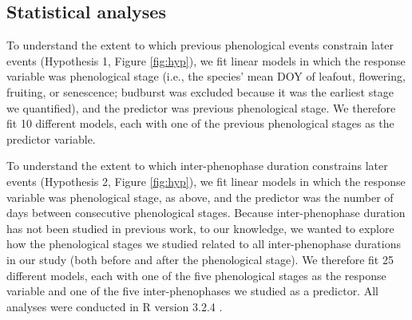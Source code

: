 \documentclass{article}
\begin{document}
\subsection*{Statistical analyses}
To understand the extent to which previous phenological events constrain later events (Hypothesis 1, Figure \ref{fig:hyp}), we fit linear models in which the response variable was phenological stage (i.e., the species' mean DOY of leafout, flowering, fruiting, or senescence; budburst was excluded because it was the earliest stage we quantified), and the predictor was previous phenological stage.  We therefore fit 10 different models, each with one of the previous phenological stages as the predictor variable. 
\par To understand the extent to which inter-phenophase duration constrains later events (Hypothesis 2, Figure \ref{fig:hyp}), we fit linear models in which the response variable was phenological stage, as above, and the predictor was the number of days between consecutive phenological stages. Because inter-phenophase duration has not been studied in previous work, to our knowledge, we wanted to explore how the phenological stages we studied related to all inter-phenophase durations in our study (both before and after the phenological stage). We therefore fit 25 different models, each with one of the five phenological stages as the response variable and one of the five inter-phenophases we studied as a predictor.
All analyses were conducted in R version 3.2.4 \citep{rcoreteam2016}.
\end{document}
